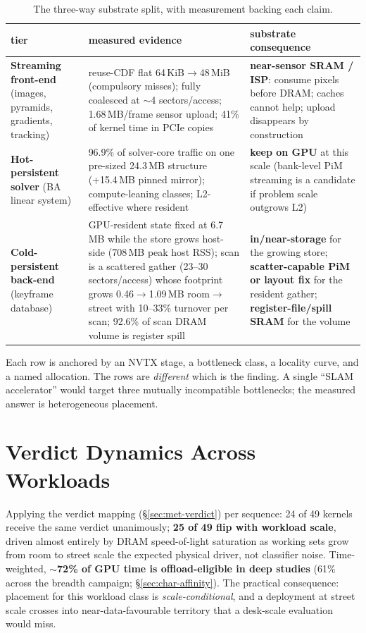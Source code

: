 \begin{table}[t]
\centering
\caption{The three-way substrate split, with measurement backing each claim.}
\label{tab:split}
\begin{tabular}{@{}p{}p{}p{}@{}}
\toprule
tier & measured evidence & substrate consequence \\
\midrule
\textbf{Streaming front-end} (images, pyramids, gradients, tracking) &
reuse-CDF flat 64\,KiB$\rightarrow$48\,MiB (compulsory misses); fully coalesced at $\sim$4 sectors/access; 1.68\,MB/frame sensor upload; 41\% of kernel time in PCIe copies &
\textbf{near-sensor SRAM / ISP}: consume pixels before DRAM; caches cannot help; upload disappears by construction \\
\addlinespace
\textbf{Hot-persistent solver} (BA linear system) &
96.9\% of solver-core traffic on one pre-sized 24.3\,MB structure (+15.4\,MB pinned mirror); compute-leaning classes; L2-effective where resident &
\textbf{keep on GPU} at this scale (bank-level PiM streaming is a candidate if problem scale outgrows L2) \\
\addlinespace
\textbf{Cold-persistent back-end} (keyframe database) &
GPU-resident state fixed at 6.7\,MB while the store grows host-side (708\,MB peak host RSS); scan is a scattered gather (23--30 sectors/access) whose footprint grows 0.46$\rightarrow$1.09\,MB room$\rightarrow$street with 10--33\% turnover per scan; 92.6\% of scan DRAM volume is register spill &
\textbf{in/near-storage} for the growing store; \textbf{scatter-capable PiM or layout fix} for the resident gather; \textbf{register-file/spill SRAM} for the volume \\
\bottomrule
\end{tabular}
\end{table}

Each row is anchored by an NVTX stage, a bottleneck class, a locality curve, and a named allocation. The rows are \emph{different} which is the finding. A single “SLAM accelerator” would target three mutually incompatible bottlenecks; the measured answer is heterogeneous placement.

\section{Verdict Dynamics Across Workloads}
\label{sec:syn-dynamics}

Applying the verdict mapping (\S\ref{sec:met-verdict}) per sequence: 24 of 49 kernels receive the same verdict unanimously; \textbf{25 of 49 flip with workload scale}, driven almost entirely by DRAM speed-of-light saturation as working sets grow from room to street scale the expected physical driver, not classifier noise. Time-weighted, \textbf{$\sim$72\% of GPU time is offload-eligible in deep studies} (61\% across the breadth campaign; \S\ref{sec:char-affinity}). The practical consequence: placement for this workload class is \emph{scale-conditional}, and a deployment at street scale crosses into near-data-favourable territory that a desk-scale evaluation would miss.

